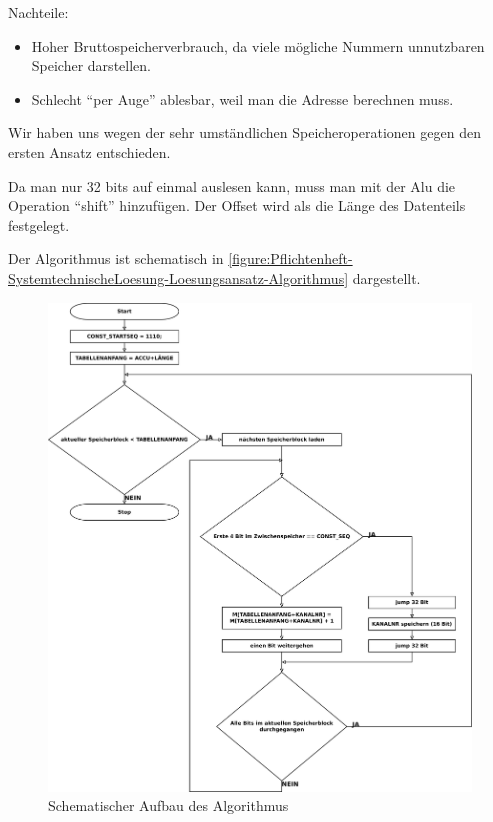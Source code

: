 Nachteile:
\begin{itemize}
    \item Hoher Bruttospeicherverbrauch, da viele mögliche Nummern unnutzbaren Speicher darstellen.
    \item Schlecht "`per Auge"' ablesbar, weil man die Adresse berechnen muss.
\end{itemize}

Wir haben uns wegen der sehr umständlichen Speicheroperationen gegen den ersten Ansatz entschieden.

Da man nur 32 bits auf einmal auslesen kann, muss man mit der Alu die Operation "`shift"' hinzufügen. Der Offset wird als die Länge des Datenteils festgelegt.

Der Algorithmus ist schematisch in \autoref{figure:Pflichtenheft-SystemtechnischeLoesung-Loesungsansatz-Algorithmus} dargestellt.

\begin{figure}[htb]
    \centering
    \includegraphics[width=\textwidth]{pflichtenheft/res/algorithmus.pdf}
    \caption{Schematischer Aufbau des Algorithmus}
    \label{figure:Pflichtenheft-SystemtechnischeLoesung-Loesungsansatz-Algorithmus}
\end{figure}

